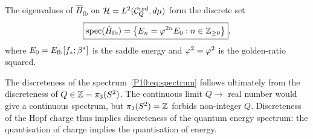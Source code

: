 \begin{theorem}
\label{P10:thm:spectrum}
The eigenvalues of $\hat{H}_\mathrm{fb}$ on $\mathcal{H} = L^2(\mathcal{C}_Q^{\mathrm{red}},d\mu)$
form the discrete set
\begin{equation}
  \boxed{\mathrm{spec}(\hat{H}_\mathrm{fb})
  = \bigl\{E_n = \varphi^{2n}E_0 : n\in\mathbb{Z}_{\geq0}\bigr\}},
  \label{P10:eq:spectrum}
\end{equation}
where $E_0 = E_{\mathrm{fb}}[f_*;\beta^{*}]$ is the saddle energy and
$\varphi^2 = \varphi^2$ is the golden-ratio squared.
\end{theorem}

\begin{remark}
\label{P10:rem:discreteness_from_topology}
The discreteness of the spectrum~\eqref{P10:eq:spectrum} follows ultimately
from the discreteness of $Q\in\mathbb{Z}=\pi_3(S^2)$.
The continuous limit $Q\to$ real number would give a continuous
spectrum, but $\pi_3(S^2)=\mathbb{Z}$ forbids non-integer $Q$.
Discreteness of the Hopf charge thus implies discreteness of the
quantum energy spectrum: the quantisation of charge implies
the quantisation of energy.
\end{remark}


